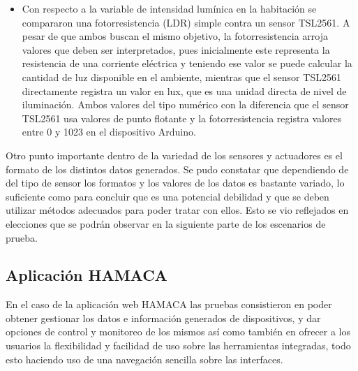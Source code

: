 \begin{itemize}
\item Con respecto a la variable de intensidad lumínica en la habitación se compararon una fotorresistencia (LDR) simple contra un sensor TSL2561. A pesar de que ambos buscan el mismo objetivo, la fotorresistencia arroja valores que deben ser interpretados, pues inicialmente este representa la resistencia de una corriente eléctrica y teniendo ese valor se puede calcular la cantidad de luz disponible en el ambiente, mientras que el sensor TSL2561 directamente registra un valor en lux, que es una unidad directa de nivel de iluminación. Ambos valores del tipo numérico con la diferencia que el sensor TSL2561 usa valores de punto flotante y la fotorresistencia registra valores entre 0 y 1023 en el dispositivo Arduino.   
\end{itemize}

Otro punto importante dentro de la variedad de los sensores y actuadores es el formato de los distintos datos generados. Se pudo constatar que dependiendo de del tipo de sensor los formatos y los valores de los datos es bastante variado, lo suficiente como para concluir que es una potencial debilidad y que se deben utilizar métodos adecuados para poder tratar con ellos. Esto se vio reflejados en elecciones que se podrán observar en la siguiente parte de los escenarios de prueba. 

\subsection{Aplicación HAMACA}
En el caso de la aplicación web HAMACA las pruebas consistieron en poder obtener gestionar los datos e información generados de dispositivos, y dar opciones de control y monitoreo de los mismos así como también en ofrecer a los usuarios la flexibilidad y facilidad de uso sobre las herramientas integradas, todo esto haciendo uso de una navegación sencilla sobre las interfaces. 

